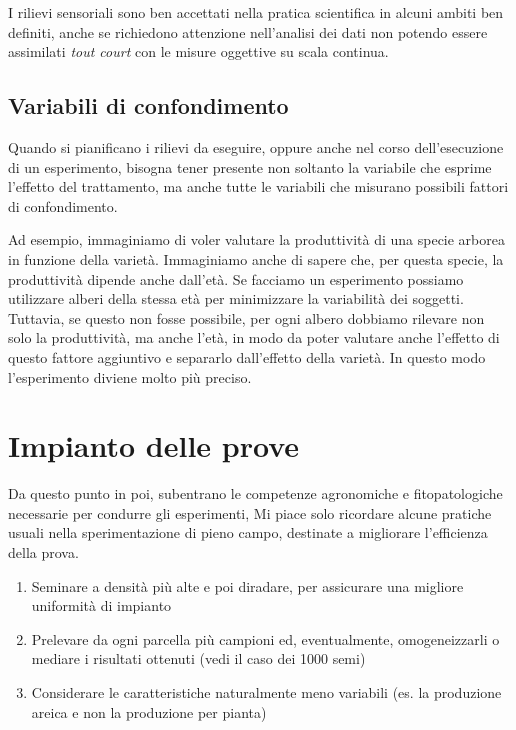 \documentclass[a4paper,12pt,oneside]{book}
\providecommand{\tightlist}{%
  \setlength{\itemsep}{0pt}\setlength{\parskip}{0pt}}
\begin{document}
I rilievi sensoriali sono ben accettati nella pratica scientifica in alcuni ambiti ben definiti, anche se richiedono attenzione nell'analisi dei dati non potendo essere assimilati \emph{tout court} con le misure oggettive su scala continua.

\hypertarget{variabili-di-confondimento}{%
\subsection{Variabili di confondimento}\label{variabili-di-confondimento}}

Quando si pianificano i rilievi da eseguire, oppure anche nel corso dell'esecuzione di un esperimento, bisogna tener presente non soltanto la variabile che esprime l'effetto del trattamento, ma anche tutte le variabili che misurano possibili fattori di confondimento.

Ad esempio, immaginiamo di voler valutare la produttività di una specie arborea in funzione della varietà. Immaginiamo anche di sapere che, per questa specie, la produttività dipende anche dall'età. Se facciamo un esperimento possiamo utilizzare alberi della stessa età per minimizzare la variabilità dei soggetti. Tuttavia, se questo non fosse possibile, per ogni albero dobbiamo rilevare non solo la produttività, ma anche l'età, in modo da poter valutare anche l'effetto di questo fattore aggiuntivo e separarlo dall'effetto della varietà. In questo modo l'esperimento diviene molto più preciso.

\hypertarget{impianto-delle-prove}{%
\section{Impianto delle prove}\label{impianto-delle-prove}}

Da questo punto in poi, subentrano le competenze agronomiche e fitopatologiche necessarie per condurre gli esperimenti, Mi piace solo ricordare alcune pratiche usuali nella sperimentazione di pieno campo, destinate a migliorare l'efficienza della prova.

\begin{enumerate}
\def\labelenumi{\arabic{enumi}.}
\tightlist
\item
  Seminare a densità più alte e poi diradare, per assicurare una migliore uniformità di impianto
\item
  Prelevare da ogni parcella più campioni ed, eventualmente, omogeneizzarli o mediare i risultati ottenuti (vedi il caso dei 1000 semi)
\item
  Considerare le caratteristiche naturalmente meno variabili (es. la produzione areica e non la produzione per pianta)
\end{enumerate}
\end{document}
